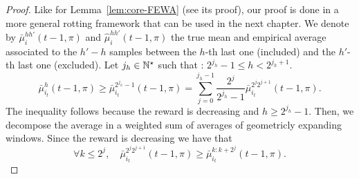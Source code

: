 \begin{proof}
Like for Lemma~\ref{lem:core-FEWA} (see its proof), our proof is done in a more general rotting framework that can be used in the next chapter. We denote by $\bar{\mu}^{hh'}_i(t-1,\pi)$ and $\hat{\mu}^{hh'}_i(t-1,\pi)$ the true mean and empirical average associated to the $h'-h$ samples between the $h$-th last one (included) and the $h'$-th last one (excluded). Let $j_h \in {\mathbb N}^\star$ such that :
$2^{j_h} -1 \leq  h < 2^{j_h+1}$.
\begin{equation}
\label{eq:eff-decompo}
\bar{\mu}^{h}_{i_t}(t-1,\pi) \geq \bar{\mu}^{2^{j_h}-1}_{i_t}(t-1,\pi) = \sum_{j=0}^{j_h-1} \frac{2^j}{2^{j_h}-1} \bar{\mu}^{2^{j}2^{j+1}}_{i_t}(t-1,\pi).
\end{equation}
The inequality follows because the reward is decreasing and $h\geq 2^{j_h}-1$. Then, we decompose the average in a weighted sum of averages of geometricly expanding windows. Since the reward is decreasing we have that 
\begin{equation*}
\forall k \leq 2^j, \quad \bar{\mu}^{2^{j}2^{j+1}}_{i_t}(t-1,\pi) \geq \bar{\mu}^{k : k+2^{j}}_{i_t}(t-1,\pi).
\end{equation*}


\end{proof}
